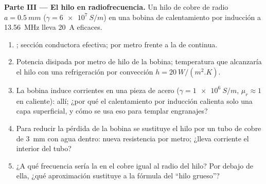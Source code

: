 \begin{problem}
\medskip
\noindent\textbf{Parte III --- El hilo en radiofrecuencia.}
Un hilo de cobre de radio $a = \qty{0.5}{mm}$ ($\gamma = \qty{6e7}{S/m}$) en una
bobina de calentamiento por inducción a \qty{13.56}{MHz} lleva \qty{20}{A} eficaces.
\begin{enumerate}[resume]
  \item {}; sección conductora efectiva;  por
        metro frente a la de continua.
  \item Potencia disipada por metro de hilo de la bobina; temperatura que
        alcanzaría el hilo con una refrigeración por convección $h = \qty{20}{W/(m^2.K)}$.
  \item La bobina induce corrientes en una pieza de acero ($\gamma =
        \qty{1e6}{S/m}$, $\mu_r \approx 1$ en caliente):  allí; ¿por qué
        el calentamiento por inducción calienta solo una capa superficial, y cómo se
        usa eso para templar engranajes?
  \item Para reducir la pérdida de la bobina se sustituye el hilo por un tubo
        de cobre de \qty{3}{mm} con agua dentro: nueva resistencia por metro; ¿lleva
        corriente el interior del tubo?
  \item ¿A qué frecuencia sería la  en el cobre igual al
        radio del hilo? Por debajo de ella, ¿qué aproximación sustituye a la
        fórmula del ``hilo grueso''?
\end{enumerate}


\end{problem}
